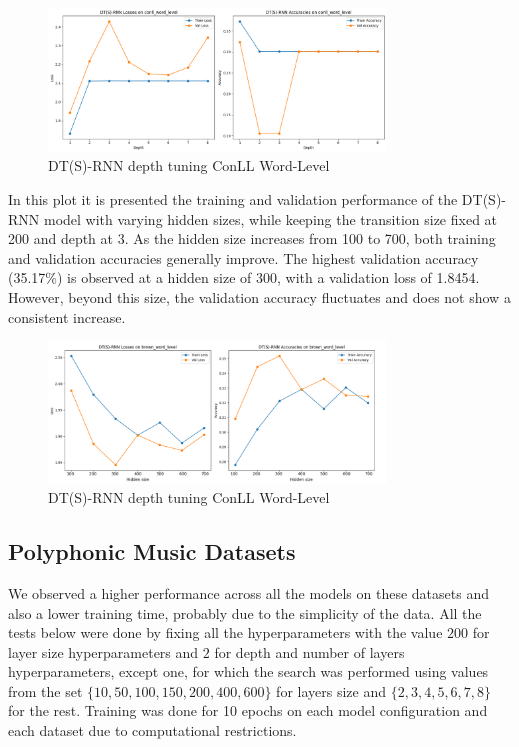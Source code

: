 \documentclass{article}
\begin{document}
\begin{figure}[H]
    \centering
    \includegraphics[width=0.8\textwidth]{conll_wordlevel_plots/dtsrnn_depth_conll_wordlevel.png}
    \caption{DT(S)-RNN depth tuning ConLL Word-Level}
    \label{fig:srnn-hidden-size-tuning}
\end{figure}

 In this plot it is presented the training and validation performance of the DT(S)-RNN model with varying hidden sizes, while keeping the transition size fixed at 200 and depth at 3. As the hidden size increases from 100 to 700, both training and validation accuracies generally improve. The highest validation accuracy (35.17\%) is observed at a hidden size of 300, with a validation loss of 1.8454. However, beyond this size, the validation accuracy fluctuates and does not show a consistent increase. 

\begin{figure}[H]
    \centering
    \includegraphics[width=0.8\textwidth]{brown_plots/dtsrnn_hiddensize_brown_wordlevel_RIGHT_LABEL.png}
    \caption{DT(S)-RNN depth tuning ConLL Word-Level}
    \label{fig:srnn-hidden-size-tuning}
\end{figure}

\subsection{Polyphonic Music Datasets}

We observed a higher performance across all the models on these datasets and also a lower training time, probably due to the simplicity of the data. All the tests below were done by fixing all the hyperparameters with the value $200$ for layer size hyperparameters and $2$ for depth and number of layers hyperparameters, except one, for which the search was performed using values from the set 
$\{10, 50, 100, 150,200, 400, 600\}$ for layers size and $\{2,3, 4, 5,6, 7, 8\}$ for the rest. Training was done for 10 epochs on each model configuration and each dataset due to computational restrictions.
\end{document}
